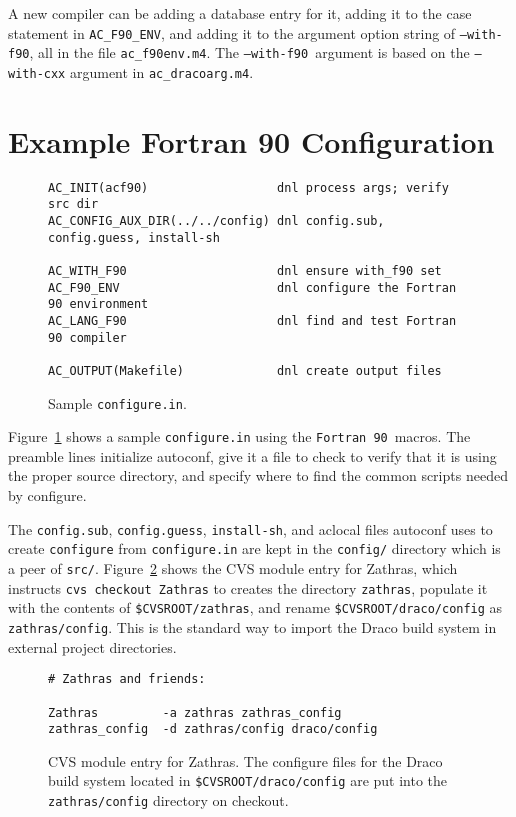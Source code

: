 \documentclass[11pt]{nmemo}
\newcommand{\fninety}{\texttt{Fortran~90}}
\newcommand{\withfninety}{\texttt{--with-f90}}
\newcommand{\fninetyenv}{\texttt{AC\_F90\_ENV}}
\begin{document}
A new compiler can be adding a database entry for it, adding it to the
case statement in \fninetyenv, and adding it to the argument option
string of \withfninety, all in the file \texttt{ac\_f90env.m4}. The
\withfninety\ argument is based on the \texttt{--with-cxx} argument in
\texttt{ac\_dracoarg.m4}.

\section{Example Fortran 90 Configuration}

\begin{figure}[hbt]
\hrulefill
\begin{verbatim}
AC_INIT(acf90)                  dnl process args; verify src dir
AC_CONFIG_AUX_DIR(../../config) dnl config.sub, config.guess, install-sh

AC_WITH_F90                     dnl ensure with_f90 set
AC_F90_ENV                      dnl configure the Fortran 90 environment
AC_LANG_F90                     dnl find and test Fortran 90 compiler 

AC_OUTPUT(Makefile)             dnl create output files
\end{verbatim}
\caption{Sample \texttt{configure.in}.}\label{fig:configure}
\hrulefill
\end{figure}

Figure~\ref{fig:configure} shows a sample \texttt{configure.in} using
the \fninety\ macros.  The preamble lines initialize autoconf, give it
a file to check to verify that it is using the proper source
directory, and specify where to find the common scripts needed by
configure.  

The \texttt{config.sub}, \texttt{config.guess}, \texttt{install-sh},
and aclocal files autoconf uses to create \texttt{configure} from
\texttt{configure.in} are kept in the \texttt{config/} directory which
is a peer of \texttt{src/}.  Figure~\ref{fig:zathras} shows the CVS
module entry for Zathras, which instructs \texttt{cvs checkout
Zathras} to creates the directory \texttt{zathras}, populate it with
the contents of \texttt{\$CVSROOT/zathras}, and rename
\texttt{\$CVSROOT/draco/config} as \texttt{zathras/config}.  This is
the standard way to import the Draco build system in external project
directories.
\begin{figure}[hbt]
\hrulefill
\begin{verbatim}
# Zathras and friends:

Zathras         -a zathras zathras_config
zathras_config  -d zathras/config draco/config
\end{verbatim}
\caption{CVS module entry for Zathras.  The configure files for the
Draco build system located in \texttt{\$CVSROOT/draco/config} are put
into the \texttt{zathras/config} directory on
checkout.}\label{fig:zathras}
\hrulefill
\end{figure}
\end{document}
